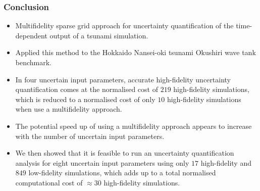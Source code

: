 \documentclass[11pt,ucs]{beamer}
\begin{document}
\begin{frame}\frametitle{Conclusion}

\begin{itemize}
\item %
Multifidelity sparse grid approach for uncertainty quantification of the time-dependent output of a tsunami simulation.

\item Applied this method to the Hokkaido Nansei-oki tsunami Okushiri wave tank benchmark.


\item In four uncertain input parameters,  accurate high-fidelity uncertainty quantification comes at the normalised cost of $219$ high-fidelity simulations, which is reduced to a normalised cost of only $10$ high-fidelity simulations when use a multifidelity approach. 

\item The potential speed up of using a multifidelity approach appears to increase with the number of uncertain input parameters. 

\item We then showed that it is feasible to run an uncertainty quantification analysis for eight uncertain input parameters using only $17$ high-fidelity and $849$ low-fidelity simulations, which adds up to a total normalised computational cost of $\approx\!30$ high-fidelity simulations.




\end{itemize}

\end{frame}
\end{document}
